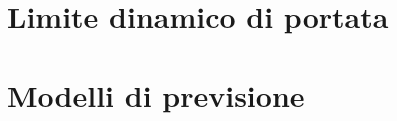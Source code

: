 \documentclass[fleqn,10pt]{SelfArx} %
\begin{document}
\section{Limite dinamico di portata}
\section{Modelli di previsione}



\end{document}
